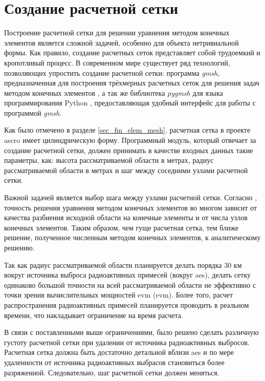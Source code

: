 \section{Создание расчетной сетки}
\label{sec_mesh_gen}

Построение расчетной сетки для решении уравнения методом конечных элементов является сложной задачей, особенно для 
объекта нетривиальной формы. Как правило, создание расчетных сеток представляет собой трудоемкий и кропотливый процесс. 
В современном мире существует ряд технологий, позволяющих упростить создание расчетной сетки: программа \textit{gmsh}, 
предназначенная для построения трёхмерных расчетных сеток для решения задач методом конечных элементов \cite{gmsh_man}, 
а так же библиотека \textit{pygmsh} для языка программирования Python \cite{pygmsh_doc}, предоставляющая удобный 
интерфейс для работы с программой \textit{gmsh}.

Как было отмечено в разделе \ref{sec_fin_elem_mesh}, расчетная сетка в проекте \ac{ascro} имеет цилиндрическую форму. 
Программный модуль, который отвечает за создание расчетной сетки, должен принимать в качестве входных данных такие 
параметры, как: высота рассматриваемой области в метрах, радиус рассматриваемой области в метрах и шаг между соседними 
узлами расчетной сетки.

Важной задачей является выбор шага между узлами расчетной сетки. Согласно \cite{mke}, точность решения уравнения методом 
конечных элементов во многом зависит от качества разбиения исходной области на конечные элементы и от числа узлов 
конечных элементов. Таким образом, чем гуще расчетная сетка, тем ближе решение, полученное численным методом конечных 
элементов, к аналитическому решению. 

Так как радиус рассматриваемой области планируется делать порядка 30 км вокруг источника выброса радиоактивных примесей 
(вокруг \ac{aes}), делать сетку одинаково большой точности на всей рассматриваемой области не эффективно с точки зрения 
вычислительных мощностей \ac{evm} (\acl{evm}). Более того, расчет распространения радиоактивных примесей планируется 
проводить в реальном времени, что накладывает ограничение на время расчета. 

В связи с поставленными выше ограничениями, было решено сделать различную густоту расчетной сетки при удалении от 
источника радиоактивных выбросов. Расчетная сетка должна быть достаточно детальной вблизи \ac{aes} и по мере удаленности 
от источника радиоактивных выбрасов становиться более разряженной. Следовательно, шаг расчетной сетки должен меняться.

